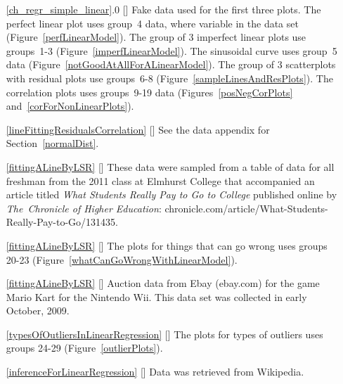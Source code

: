 \begin{itemize}
\item[\ref{ch_regr_simple_linear}.0]
    [\datalink{simulated\_scatter}]
    Fake data used for the first three plots.
    The perfect linear plot uses group~4 data,
    where  variable in the data set
    (Figure~\ref{perfLinearModel}).
    The group of 3 imperfect linear plots use groups~1-3
    (Figure~\ref{imperfLinearModel}).
    The sinusoidal curve uses group~5 data
    (Figure~\ref{notGoodAtAllForALinearModel}).
    The group of 3 scatterplots with residual plots use groups~6-8
    (Figure~\ref{sampleLinesAndResPlots}).
    The correlation plots uses groups~9-19 data
    (Figures~\ref{posNegCorPlots} and~\ref{corForNonLinearPlots}).
\item[\ref{lineFittingResidualsCorrelation}]
    [\datalink{possum}]
    See the data appendix for Section~\ref{normalDist}.

\item[\ref{fittingALineByLSR}]
    [\datalink{elmhurst}]
    These data were sampled from a table of data for all
    freshman from the 2011 class at Elmhurst College that
    accompanied an article titled
    \emph{What Students Really Pay to Go to College}
    published online by \emph{The~Chronicle of Higher Education}:
        {chronicle.com/article/What-Students-Really-Pay-to-Go/131435}.
\item[\ref{fittingALineByLSR}]
    [\datalink{simulated\_scatter}]
    The plots for things that can go wrong uses groups 20-23
    (Figure~\ref{whatCanGoWrongWithLinearModel}).
\item[\ref{fittingALineByLSR}]
    [\datalink{mario\_kart}]
    Auction data from Ebay (ebay.com) for the game Mario Kart
    for the Nintendo Wii.
    This data set was collected in early October, 2009.

\item[\ref{typesOfOutliersInLinearRegression}]
    [\datalink{simulated\_scatter}]
    The plots for types of outliers uses groups 24-29
    (Figure~\ref{outlierPlots}).

\item[\ref{inferenceForLinearRegression}]
    [\datalink{midterms\_house}]
    Data was retrieved from Wikipedia.

\end{itemize}







